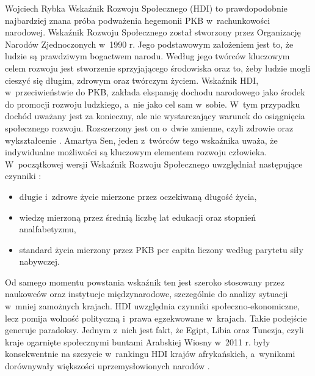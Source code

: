 \begin{artplenv}{Wojciech Rybka}
Wskaźnik Rozwoju Społecznego (HDI) to prawdopodobnie najbardziej znana próba podważenia hegemonii PKB w~rachunkowości
narodowej. Wskaźnik Rozwoju Społecznego został stworzony przez Organizację Narodów Zjednoczonych w~1990 r. Jego
podstawowym założeniem jest to, że ludzie są prawdziwym bogactwem narodu. Według jego twórców kluczowym celem rozwoju
jest stworzenie sprzyjającego środowiska oraz to, żeby ludzie mogli cieszyć się długim, zdrowym oraz twórczym życiem.
Wskaźnik HDI, w~przeciwieństwie do PKB, zakłada ekspansję dochodu narodowego jako środek do promocji rozwoju ludzkiego,
a~nie jako cel sam w~sobie. W~tym przypadku dochód uważany jest za konieczny, ale nie wystarczający warunek do
osiągnięcia społecznego rozwoju. Rozszerzony jest on o~dwie zmienne, czyli zdrowie oraz wykształcenie
\parencite{fioramonti_gross_2013}.
Amartya Sen, jeden z~twórców tego wskaźnika uważa, że indywidualne
możliwości są kluczowym elementem rozwoju człowieka. W~początkowej wersji Wskaźnik Rozwoju Społecznego uwzględniał
następujące czynniki
\parencite{united_nations_development_programme_human_2019}:

\begin{itemize}
\item długie i~zdrowe życie mierzone przez oczekiwaną długość życia,
\item wiedzę mierzoną przez średnią liczbę lat edukacji oraz stopnień analfabetyzmu,
\item standard życia mierzony przez PKB per capita liczony według parytetu siły nabywczej.
\end{itemize}

Od samego momentu powstania wskaźnik ten jest szeroko stosowany przez naukowców oraz instytucje międzynarodowe,
szczególnie do analizy sytuacji w~mniej zamożnych krajach. HDI uwzględnia czynniki społeczno-ekonomiczne, lecz pomija
wolność polityczną i~prawa egzekwowane w~krajach. Takie podejście generuje paradoksy. Jednym z~nich jest fakt, że
Egipt, Libia oraz Tunezja, czyli kraje ogarnięte społecznymi buntami Arabskiej Wiosny w~2011 r. były konsekwentnie na
szczycie w~rankingu HDI krajów afrykańskich, a~wynikami dorównywały większości uprzemysłowionych narodów
\parencite{fioramonti_gross_2013}.


\end{artplenv}
